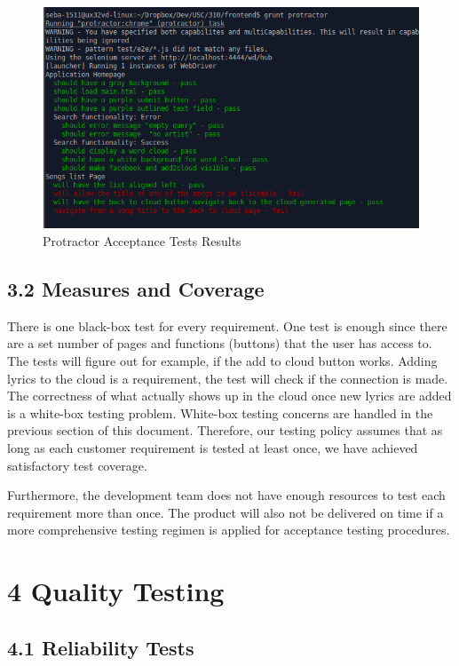\documentclass[]{article}
\begin{document}
\begin{figure}[htbp]
\centering
\includegraphics{protractor.png}
\caption{Protractor Acceptance Tests Results}
\end{figure}

\subsection{\textbf{3.2 Measures and
Coverage}}\label{measures-and-coverage-1}

There is one black-box test for every requirement. One test is enough
since there are a set number of pages and functions (buttons) that the
user has access to. The tests will figure out for example, if the add to
cloud button works. Adding lyrics to the cloud is a requirement, the
test will check if the connection is made. The correctness of what
actually shows up in the cloud once new lyrics are added is a white-box
testing problem. White-box testing concerns are handled in the previous
section of this document. Therefore, our testing policy assumes that as
long as each customer requirement is tested at least once, we have
achieved satisfactory test coverage.

Furthermore, the development team does not have enough resources to test
each requirement more than once. The product will also not be delivered
on time if a more comprehensive testing regimen is applied for
acceptance testing procedures.

\section{\textbf{4 Quality Testing}}\label{quality-testing}

\subsection{\textbf{4.1 Reliability Tests}}\label{reliability-tests}
\end{document}
